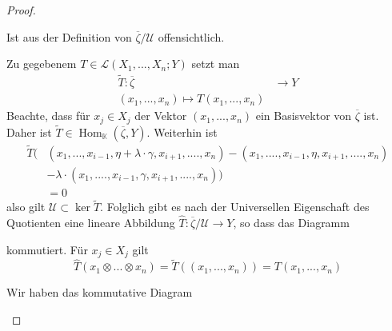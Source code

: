 \documentclass[12pt,a4paper]{article}
\theoremstyle{definition}
\theoremstyle{remark}
\renewcommand{\bar}[1]{\overline{#1}}
\renewcommand{\hat}[1]{\widehat{#1}}
\DeclareMathOperator{\Hom}{Hom}
\begin{document}
	\begin{proof}
		\begin{proofenum}
			\item 
				Ist aus der Definition von $\bar{\zeta}/\mathcal{U}$ offensichtlich.
			\item
				Zu gegebenem $T \in \mathcal{L}(X_1,...,X_n;Y)$ setzt man
				\begin{equation}
					\begin{split}
						\tilde{T} : \bar{\zeta} &\rightarrow Y \\
						(x_1,...,x_n) \mapsto T(x_1,...,x_n)
					\end{split}
				\end{equation}
				Beachte, dass für $x_j \in X_j$ der Vektor $(x_1,...,x_n)$ ein Basisvektor von $\bar{\zeta}$ ist. Daher ist $\tilde{T} \in \Hom_{\mathbb{K}}(\bar{\zeta}, Y)$. Weiterhin ist
				\begin{equation}
					\begin{split}
						\tilde{T} ( &(x_1,...,x_{i-1}, \eta + \lambda \cdot \gamma, x_{i+1},....,x_n)-(x_1,....,x_{i-1},\eta,x_{i+1},....,x_n) \\
						 &- \lambda \cdot (x_1,....,x_{i-1}, \gamma,x_{i+1},....,x_n) ) \\
						 &= 0
					\end{split}
				\end{equation}
				also gilt $\mathcal{U} \subset \ker \tilde{T}$. Folglich gibt es nach der Universellen Eigenschaft des Quotienten eine lineare Abbildung $\hat{T}: \bar{\zeta}/\mathcal{U} \rightarrow Y$, so dass das Diagramm
				\begin{center}
				\end{center}
				kommutiert. Für $x_j \in X_j$ gilt
				\begin{equation}
					\hat{T}(x_1 \otimes ... \otimes x_n) = \tilde{T}\left( (x_1,...,x_n) \right)= T(x_1,...,x_n)
				\end{equation}
			\item 
				Wir haben das kommutative Diagram
				\begin{center}
\end{center}
\end{proofenum}
\end{proof}
\end{document}
